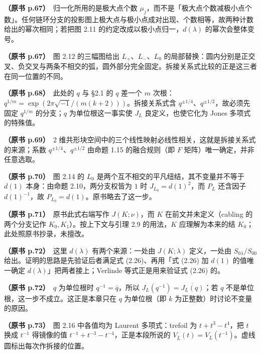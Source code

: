 \noindent \textbf{（原书 p.67）}\ 归一化所用的是极大点个数 $\mu_j$，而不是「极大点个数减极小点个数」。任何链环分支的投影图上极大点与极小点成对出现、个数相等，故两种计数给出的幂次相同；若把图 2.11 的约定改成以极小点归一，$d(\lambda)$ 的幂次会整体变号。\par\smallskip

\noindent \textbf{（原书 p.67）}\ 图 2.12 的三幅图给出 $L_+$、$L_-$、$L_0$ 的局部替换：圆内分别是正交叉、负交叉与两条不相交的弧，圆外部分完全固定。拆接关系式比较的正是这三者在同一位置的不同。\par\smallskip

\noindent \textbf{（原书 p.68）}\ 此处的 $q$ 与 §2.1 的 $q$ 差一个 $m$ 次根：$q^{1/m}=\exp(2\pi\sqrt{-1}/(m(k+2)))$。拆接关系式含 $q^{\pm1/4}$、$q^{\pm1/2}$，故必须先固定 $q^{1/m}$ 的分支；$q$ 为单位根这一事实使 $J_L$ 良定义，也使它化为 Jones 多项式的特殊值。\par\smallskip

\noindent \textbf{（原书 p.69）}\ $2$ 维共形块空间中的三个线性映射必线性相关，这就是拆接关系式的来源；系数 $q^{\pm1/4}$、$q^{\pm1/2}$ 由命题 1.15 的融合规则（即 $F$ 矩阵）唯一确定，并非任意选取。\par\smallskip

\noindent \textbf{（原书 p.70）}\ 图 2.14 的 $L_0$ 是两个互不相交的平凡纽结，其不变量并不等于 $d(1)$ 本身：由命题 2.10，两分支权皆为 $1$ 时 $J_{L_0}=d(1)^2$，而 $P_L$ 还含因子 $d(1)^{-1}$，故 $P_{L_0}=d(1)$。原书略去了这一步。\par\smallskip

\noindent \textbf{（原书 p.71）}\ 原书此式右端写作 $J(K;\nu)$，而 $K$ 在前文并未定义（cabling 的两个分支记作 $K_0,K_1$）。按上下文与引理 2.9 的用法，$K$ 应理解为本来的结 $K_0$；此处照原书抄录，未擅改。\par\smallskip

\noindent \textbf{（原书 p.72）}\ 这里 $d(\lambda)$ 有两个来源：一处由 $J(K;\lambda)$ 定义，一处由 $S_{0\lambda}/S_{00}$ 给出。证明的思路是先验证后者满足式 (2.26)、再用「式 (2.26) 加 $d(1)$ 的值唯一确定 $d(\lambda)$」把两者接上；Verlinde 等式正是用来验证式 (2.26) 的。\par\smallskip

\noindent \textbf{（原书 p.72）}\ $q$ 为单位根时 $q^{-1}=\bar q$，所以 $J_L(q^{-1})=\overline{J_L(q)}$；若 $q$ 不是单位根，这一步不成立。这正是本章只在 $q$ 为单位根（即 $k$ 为正整数）时讨论不变量的原因。\par\smallskip

\noindent \textbf{（原书 p.73）}\ 图 2.16 中各值均为 Laurent 多项式：trefoil 为 $t+t^3-t^4$，把 $t$ 换成 $t^{-1}$ 得镜像的值 $t^{-1}+t^{-3}-t^{-4}$，正是本段所说的 $V_{\bar L}(t)=V_L(t^{-1})$。虚线圆标出每次作拆接的位置。\par\smallskip

